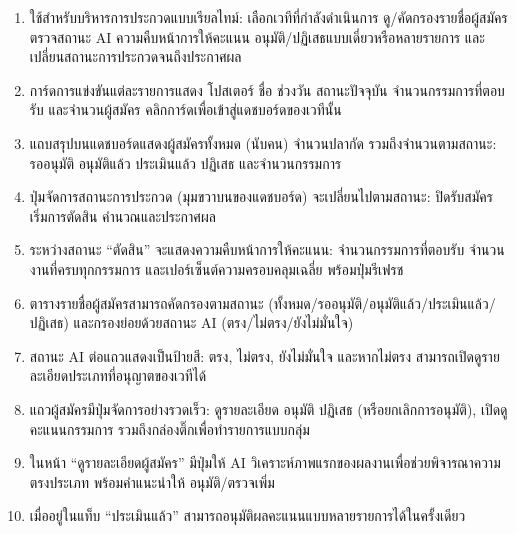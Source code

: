 \begin{sloppypar}
	\begin{enumerate}
		\item ใช้สำหรับบริหารการประกวดแบบเรียลไทม์: เลือกเวทีที่กำลังดำเนินการ ดู/คัดกรองรายชื่อผู้สมัคร ตรวจสถานะ AI ความคืบหน้าการให้คะแนน อนุมัติ/ปฏิเสธแบบเดี่ยวหรือหลายรายการ และเปลี่ยนสถานะการประกวดจนถึงประกาศผล
		\item การ์ดการแข่งขันแต่ละรายการแสดง โปสเตอร์ ชื่อ ช่วงวัน สถานะปัจจุบัน จำนวนกรรมการที่ตอบรับ และจำนวนผู้สมัคร คลิกการ์ดเพื่อเข้าสู่แดชบอร์ดของเวทีนั้น
		\item แถบสรุปบนแดชบอร์ดแสดงผู้สมัครทั้งหมด (นับคน) จำนวนปลากัด รวมถึงจำนวนตามสถานะ: รออนุมัติ อนุมัติแล้ว ประเมินแล้ว ปฏิเสธ และจำนวนกรรมการ
		\item ปุ่มจัดการสถานะการประกวด (มุมขวาบนของแดชบอร์ด) จะเปลี่ยนไปตามสถานะ: ปิดรับสมัคร  เริ่มการตัดสิน  คำนวณและประกาศผล
		\item ระหว่างสถานะ “ตัดสิน” จะแสดงความคืบหน้าการให้คะแนน: จำนวนกรรมการที่ตอบรับ จำนวนงานที่ครบทุกกรรมการ และเปอร์เซ็นต์ความครอบคลุมเฉลี่ย พร้อมปุ่มรีเฟรช
		\item ตารางรายชื่อผู้สมัครสามารถคัดกรองตามสถานะ (ทั้งหมด/รออนุมัติ/อนุมัติแล้ว/ประเมินแล้ว/ปฏิเสธ) และกรองย่อยด้วยสถานะ AI (ตรง/ไม่ตรง/ยังไม่มั่นใจ)
		\item สถานะ AI ต่อแถวแสดงเป็นป้ายสี: ตรง, ไม่ตรง, ยังไม่มั่นใจ และหากไม่ตรง สามารถเปิดดูรายละเอียดประเภทที่อนุญาตของเวทีได้
		\item แถวผู้สมัครมีปุ่มจัดการอย่างรวดเร็ว: ดูรายละเอียด อนุมัติ ปฏิเสธ (หรือยกเลิกการอนุมัติ), เปิดดูคะแนนกรรมการ รวมถึงกล่องติ๊กเพื่อทำรายการแบบกลุ่ม
		\item ในหน้า “ดูรายละเอียดผู้สมัคร” มีปุ่มให้ AI วิเคราะห์ภาพแรกของผลงานเพื่อช่วยพิจารณาความตรงประเภท พร้อมคำแนะนำให้ อนุมัติ/ตรวจเพิ่ม
		\item เมื่ออยู่ในแท็บ “ประเมินแล้ว” สามารถอนุมัติผลคะแนนแบบหลายรายการได้ในครั้งเดียว
	\end{enumerate}
\end{sloppypar}

\par

